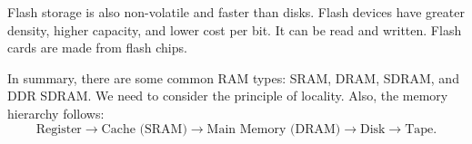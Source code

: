 Flash storage is also non-volatile and faster than disks. Flash devices have greater density, higher capacity, and lower cost per bit. It can be read and written. Flash cards are made from flash chips.

In summary, there are some common RAM types: SRAM, DRAM, SDRAM, and DDR SDRAM. We need to consider the principle of locality. Also, the memory hierarchy follows:
\[
\text{Register} \rightarrow \text{Cache (SRAM)} \rightarrow \text{Main Memory (DRAM)} \rightarrow \text{Disk} \rightarrow \text{Tape}.
\]
